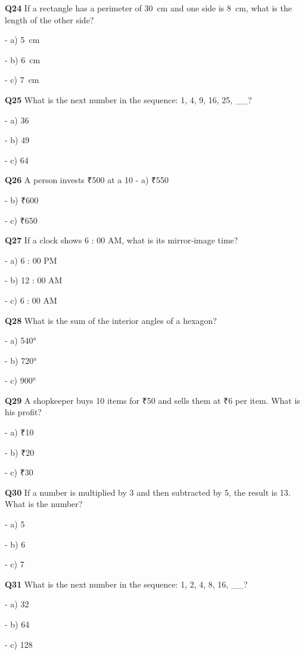 \textbf{Q24} If a rectangle has a perimeter of 30 cm and one side is 8 cm, what is the length of the other side?\par
\quad - a) 5 cm\par
\quad - b) 6 cm\par
\quad - c) 7 cm\par

\textbf{Q25} What is the next number in the sequence: 1, 4, 9, 16, 25, __?\par
\quad - a) 36\par
\quad - b) 49\par
\quad - c) 64\par

\textbf{Q26} A person invests ₹500 at a 10 %
\quad - a) ₹550\par
\quad - b) ₹600\par
\quad - c) ₹650\par

\textbf{Q27} If a clock shows 6 : 00 AM, what is its mirror‑image time?\par
\quad - a) 6 : 00 PM\par
\quad - b) 12 : 00 AM\par
\quad - c) 6 : 00 AM\par

\textbf{Q28} What is the sum of the interior angles of a hexagon?\par
\quad - a) 540°\par
\quad - b) 720°\par
\quad - c) 900°\par

\textbf{Q29} A shopkeeper buys 10 items for ₹50 and sells them at ₹6 per item. What is his profit?\par
\quad - a) ₹10\par
\quad - b) ₹20\par
\quad - c) ₹30\par

\textbf{Q30} If a number is multiplied by 3 and then subtracted by 5, the result is 13. What is the number?\par
\quad - a) 5\par
\quad - b) 6\par
\quad - c) 7\par

\textbf{Q31} What is the next number in the sequence: 1, 2, 4, 8, 16, __?\par
\quad - a) 32\par
\quad - b) 64\par
\quad - c) 128\par

